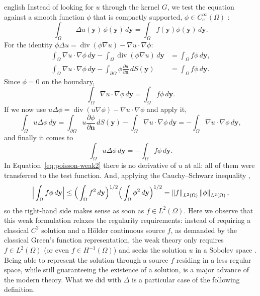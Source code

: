 \begin{hyphenrules}{english}
Instead of looking for $u$ through the kernel $G$, we test the equation against a smooth function
$\phi$ that is compactly supported, $\phi\in C_c^\infty(\Omega)$ \cite{reyna_sobolev}:
\begin{equation}
  \int_\Omega-\Delta u(\mathbf{y})\,\phi(\mathbf{y})\,d\mathbf{y}=\int_\Omega f(\mathbf{y})\phi(\mathbf{y})\,d\mathbf{y}.
  \label{eq:poisson-tested}
\end{equation}
For the identity $\phi\Delta u=\operatorname{div}(\phi\nabla u)-\nabla u\cdot\nabla\phi$:
\begin{align*}
  \int_\Omega\nabla u\cdot\nabla\phi\,d\mathbf{y}-\int_\Omega\operatorname{div}(\phi\nabla u)\,d\mathbf{y}
    &=\int_\Omega f\phi\,d\mathbf{y},\\
  \int_\Omega\nabla u\cdot\nabla\phi\,d\mathbf{y}-\int_{\partial\Omega}\phi\frac{\partial u}{\partial\mathbf{n}}\,d S(\mathbf{y})
    &=\int_\Omega f\phi\,d\mathbf{y}.
\end{align*}
Since $\phi=0$ on the boundary,
\begin{equation}
  \int_\Omega\nabla u\cdot\nabla\phi\,d\mathbf{y}=\int_\Omega f\phi\,d\mathbf{y}.
  \label{eq:poisson-weak1}
\end{equation}
If we now use $u\Delta\phi=\operatorname{div}(u\nabla\phi)-\nabla u\cdot\nabla\phi$ and apply it,
\[
  \int_\Omega u\Delta\phi\,d\mathbf{y}=\int_{\partial\Omega}u\frac{\partial\phi}{\partial\mathbf{n}}\,d S(\mathbf{y})
  -\int_\Omega\nabla u\cdot\nabla\phi\,d\mathbf{y}=-\int_\Omega\nabla u\cdot\nabla\phi\,d\mathbf{y},
\]
and finally it comes to
\begin{equation}
  \int_\Omega u\Delta\phi\,d\mathbf{y}=-\int_\Omega f\phi\,d\mathbf{y}.
  \label{eq:poisson-weak2}
\end{equation}
In Equation~\eqref{eq:poisson-weak2} there is no derivative of $u$ at all: all of them were transferred to the
test function. And, applying the Cauchy--Schwarz inequality \cite{castillo2014},
\begin{equation}
  \Big|\int_\Omega f\phi\,d\mathbf{y}\Big|\le\Big(\int_\Omega f^2\,d\mathbf{y}\Big)^{1/2}\Big(\int_\Omega\phi^2\,d\mathbf{y}\Big)^{1/2}
  =\left\lVert f \right\rVert_{L^2(\Omega)}\left\lVert \phi \right\rVert_{L^2(\Omega)},
  \label{eq:cauchy-schwarz}
\end{equation}
so the right-hand side makes sense as soon as $f\in L^2(\Omega)$. Here we observe that this weak
formulation relaxes the regularity requirements: instead of requiring a classical $C^2$ solution and a
Hölder continuous source $f$, as demanded by the classical Green's function representation, the weak
theory only requires $f\in L^2(\Omega)$ (or even $f\in H^{-1}(\Omega)$) and seeks the solution $u$ in a
Sobolev space \cite{castillo2014}. Being able to represent the solution through a source $f$
residing in a less regular space, while still guaranteeing the existence of a solution, is a major
advance of the modern theory. What we did with $\Delta$ is a particular case of the following
definition.


\end{hyphenrules}
